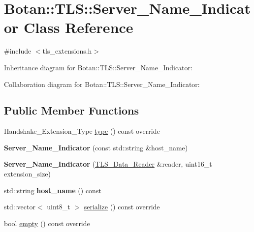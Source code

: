 \hypertarget{class_botan_1_1_t_l_s_1_1_server___name___indicator}{}\section{Botan\+:\+:T\+LS\+:\+:Server\+\_\+\+Name\+\_\+\+Indicator Class Reference}
\label{class_botan_1_1_t_l_s_1_1_server___name___indicator}


{\ttfamily \#include $<$tls\+\_\+extensions.\+h$>$}



Inheritance diagram for Botan\+:\+:T\+LS\+:\+:Server\+\_\+\+Name\+\_\+\+Indicator\+:


Collaboration diagram for Botan\+:\+:T\+LS\+:\+:Server\+\_\+\+Name\+\_\+\+Indicator\+:
\subsection*{Public Member Functions}
\begin{DoxyCompactItemize}
\item 
Handshake\+\_\+\+Extension\+\_\+\+Type \mbox{\hyperlink{class_botan_1_1_t_l_s_1_1_server___name___indicator_a3ecbe137658cbab2797a05441e65f42f}{type}} () const override
\item 
\mbox{\label{class_botan_1_1_t_l_s_1_1_server___name___indicator_a7d5960fcd5fcb3fc939112968dc4b8ae}} 
{\bfseries Server\+\_\+\+Name\+\_\+\+Indicator} (const std\+::string \&host\+\_\+name)
\item 
\mbox{\label{class_botan_1_1_t_l_s_1_1_server___name___indicator_ae376ef83ee5d49e0cce8089fc3c508bc}} 
{\bfseries Server\+\_\+\+Name\+\_\+\+Indicator} (\mbox{\hyperlink{class_botan_1_1_t_l_s_1_1_t_l_s___data___reader}{T\+L\+S\+\_\+\+Data\+\_\+\+Reader}} \&reader, uint16\+\_\+t extension\+\_\+size)
\item 
\mbox{\label{class_botan_1_1_t_l_s_1_1_server___name___indicator_a1fb2c1f096aec8be1b5bbeda647a8241}} 
std\+::string {\bfseries host\+\_\+name} () const
\item 
std\+::vector$<$ uint8\+\_\+t $>$ \mbox{\hyperlink{class_botan_1_1_t_l_s_1_1_server___name___indicator_a0088bcdbfb50c9b2bf13ec3fe1144439}{serialize}} () const override
\item 
bool \mbox{\hyperlink{class_botan_1_1_t_l_s_1_1_server___name___indicator_a24967daf77707733edc72619984bfb8a}{empty}} () const override
\end{DoxyCompactItemize}
